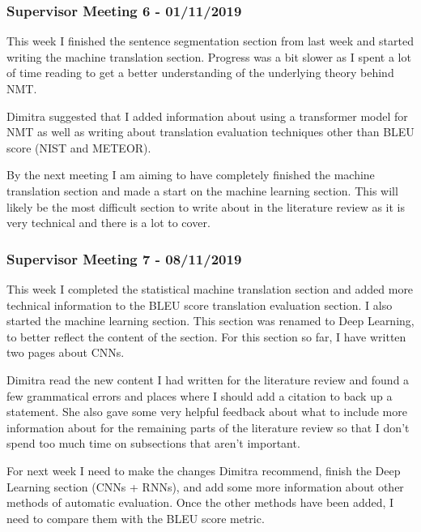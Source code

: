 \subsubsection{Supervisor Meeting 6 - 01/11/2019}
This week I finished the sentence segmentation section from last week and started writing the machine translation section. Progress was a bit slower as I spent a lot of time reading to get a better understanding of the underlying theory behind NMT.

Dimitra suggested that I added information about using a transformer model for NMT as well as writing about translation evaluation techniques other than BLEU score (NIST and METEOR).

By the next meeting I am aiming to have completely finished the machine translation section and made a start on the machine learning section. This will likely be the most difficult section to write about in the literature review as it is very technical and there is a lot to cover.


\subsubsection{Supervisor Meeting 7 - 08/11/2019}
This week I completed the statistical machine translation section and added more technical information to the BLEU score translation evaluation section. I also started the machine learning section. This section was renamed to Deep Learning, to better reflect the content of the section. For this section so far, I have written two pages about CNNs.

Dimitra read the new content I had written for the literature review and found a few grammatical errors and places where I should add a citation to back up a statement. She also gave some very helpful feedback about what to include more information about for the remaining parts of the literature review so that I don’t spend too much time on subsections that aren’t important.

For next week I need to make the changes Dimitra recommend, finish the Deep Learning section (CNNs + RNNs), and add some more information about other methods of automatic evaluation. Once the other methods have been added, I need to compare them with the BLEU score metric.
